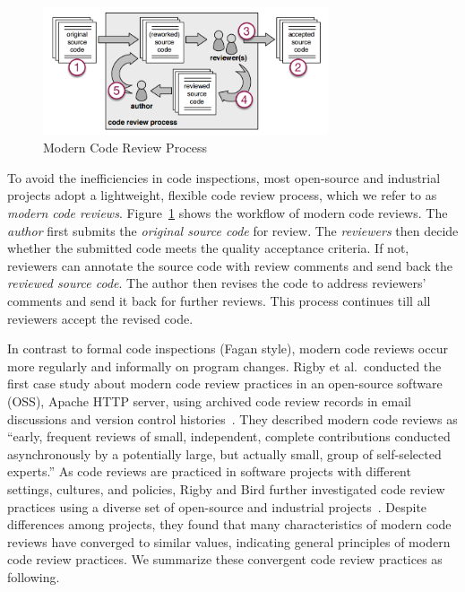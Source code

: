 \begin{figure}[ht]
 \centering
 \includegraphics[width=0.75\textwidth]{images/review-process.png}
 \caption{Modern Code Review Process~\cite{beller2014modern}}
 \label{fig:review-process}
\end{figure}

To avoid the inefficiencies in code inspections, most open-source and industrial projects adopt a lightweight, flexible code review process, which we refer to as {\em modern code reviews}. Figure~\ref{fig:review-process} shows the workflow of modern code reviews. The {\em author} first submits the {\em original source code} for review. The {\em reviewers} then decide whether the submitted code meets the quality acceptance criteria. If not, reviewers can annotate the source code with review comments and send back the {\em reviewed source code}. The author then revises the code to address reviewers' comments and send it back for further reviews. This process continues till all reviewers accept the revised code.

In contrast to formal code inspections (Fagan style), modern code reviews occur more regularly and informally on program changes. Rigby et al.~conducted the first case study about modern code review practices in an open-source software (OSS), Apache HTTP server, using archived code review records in email discussions and version control histories~\cite{Rigby2008:apache}. They described modern code reviews as ``early, frequent reviews of small, independent, complete contributions conducted asynchronously by a potentially large, but actually small, group of self-selected experts.'' As code reviews are practiced in software projects with different settings, cultures, and policies, Rigby and Bird further investigated code review practices using a diverse set of open-source and industrial projects~\cite{rigby2013convergent}. Despite differences among projects, they found that many characteristics of modern code reviews have converged to similar values, indicating general principles of modern code review practices. We summarize these convergent code review practices as following.

